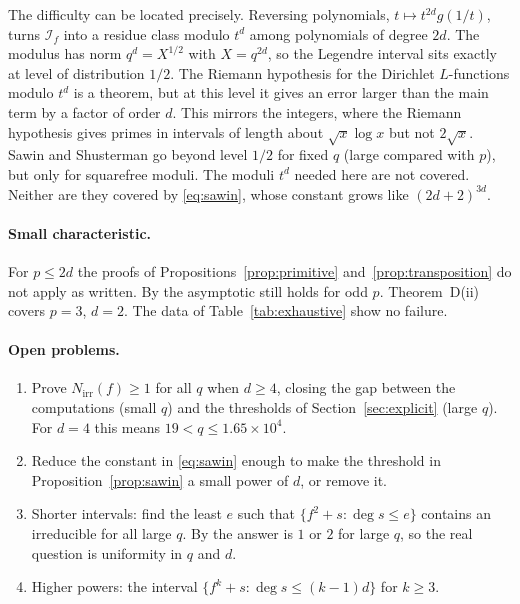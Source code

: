 \documentclass[11pt,a4paper]{article}
\theoremstyle{definition}
\theoremstyle{remark}
\newcommand{\Nirr}{N_{\mathrm{irr}}}
\newcommand{\cI}{\mathcal{I}}
\begin{document}
The difficulty can be located precisely. Reversing polynomials, $t\mapsto t^{2d}g(1/t)$, turns
$\cI_f$ into a residue class modulo $t^{d}$ among polynomials of degree $2d$. The modulus has
norm $q^d=X^{1/2}$ with $X=q^{2d}$, so the Legendre interval sits exactly at level of distribution $1/2$.
The Riemann hypothesis for the Dirichlet $L$-functions modulo $t^d$ is a theorem, but at this level it
gives an error larger than the main term by a factor of order $d$. This mirrors the integers, where the
Riemann hypothesis gives primes in intervals of length about $\sqrt x\log x$ but not $2\sqrt x$.
Sawin and Shusterman \cite{SawinShusterman2022} go beyond level $1/2$ for fixed $q$ (large compared
with $p$), but only for squarefree moduli. The moduli $t^d$ needed here are not covered.
Neither are they covered by \eqref{eq:sawin}, whose constant grows like $(2d+2)^{3d}$.

\paragraph{Small characteristic.}
For $p\le2d$ the proofs of Propositions~\ref{prop:primitive} and~\ref{prop:transposition}
do not apply as written. By \cite{BBR2015} the asymptotic still holds for odd $p$.
Theorem~D(ii) covers $p=3$, $d=2$. The data of Table~\ref{tab:exhaustive} show no failure.

\paragraph{Open problems.}
\begin{enumerate}[label=(\arabic*),nosep]
\item Prove $\Nirr(f)\ge1$ for all $q$ when $d\ge4$, closing the gap between the
      computations (small $q$) and the thresholds of Section~\ref{sec:explicit} (large $q$).
      For $d=4$ this means $19<q\le1.65\times10^4$.
\item Reduce the constant in \eqref{eq:sawin} enough to make the threshold in
      Proposition~\ref{prop:sawin} a small power of $d$, or remove it.
\item Shorter intervals: find the least $e$ such that $\{f^2+s:\deg s\le e\}$ contains an
      irreducible for all large $q$. By \cite{BBR2015} the answer is $1$ or $2$ for large $q$,
      so the real question is uniformity in $q$ and $d$.
\item Higher powers: the interval $\{f^k+s:\deg s\le(k-1)d\}$ for $k\ge3$.
\end{enumerate}
\end{document}
